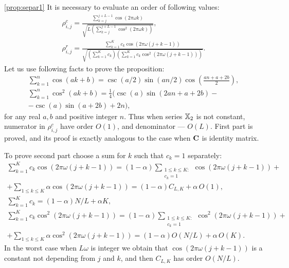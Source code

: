 \documentclass[12pt,a4paper,fleqn,leqno]{article}
\begin{document}
\begin{proof5}{\ref{prop:separ1}}
It is necessary to evaluate an order of following values:
\begin{gather*}
\rho^c_{i,j} = \frac{\sum_{k=j}^{j + L - 1} \cos(2 \pi \omega k)}{\sqrt{L (\sum_{k=j}^{j + L - 1} \cos^2(2 \pi \omega k))}},\\ \rho^r_{i,j} = \frac{\sum_{k=1}^K c_k\cos(2 \pi \omega (j + k - 1))}{\sqrt{(\sum_{k=1}^K c_k) (\sum_{k=1}^K c_k\cos^2(2 \pi \omega (j + k - 1)))}}.
\end{gather*}
Let us use following facts to prove the proposition:
\begin{gather*}
\sum_{k=1}^n \cos(ak + b) = \csc(a/2) \sin(an / 2) \cos \left(\frac{an + a + 2b}{2} \right), \\
\sum_{k=1}^n \cos^2(ak + b) = \frac{1}{4}(\csc(a) \sin(2an + a + 2b) -\\ - \csc(a)\sin(a + 2b) + 2n),
\end{gather*}
for any real $a, b$ and positive integer $n$.
Thus when series $\mathbb{X}_2$ is not constant, numerator in $\rho^c_{i,j}$ have order $O(1)$, and denominator --- $O(L)$.
First part is proved, and its proof is exactly analogous to the case when $\mathbf{C}$ is identity matrix.

To prove second part choose a sum for $k$ such that $c_k=1$ separately:
\begin{gather*}
\sum_{k=1}^K c_k\cos(2 \pi \omega (j + k - 1)) = (1-\alpha) \sum_{\substack{1 \le k \le K: \\ c_k = 1}}\cos(2 \pi \omega (j + k - 1)) +\\ +\sum_{1 \le k \le K}\alpha \cos(2 \pi \omega (j + k - 1)) = (1-\alpha) C_{L,K} + \alpha\, O(1),
\\
\sum_{k=1}^K c_k = (1-\alpha) N/L + \alpha K,
\\
\sum_{k=1}^K c_k\cos^2(2 \pi \omega (j + k - 1)) = (1-\alpha)\sum_{\substack{1 \le k \le K: \\ c_k = 1}}\cos^2(2 \pi \omega (j + k - 1)) +\\ +\sum_{1 \le k \le K }\alpha \cos^2(2 \pi \omega (j + k - 1)) = (1-\alpha) O(N/L) + \alpha\, O(K).
\end{gather*}
In the worst case when $L\omega$ is integer we obtain that $\cos(2 \pi \omega (j + k - 1))$ is a constant not depending from $j$ and $k$, and then $C_{L,K}$ has order $O(N/L)$.
\end{proof5}
\end{document}
